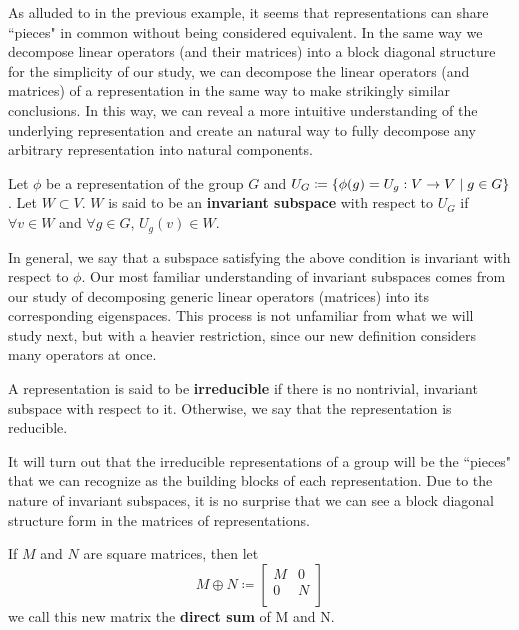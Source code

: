 As alluded to in the previous example, it seems that representations can share ``pieces" in common without being considered equivalent. In the same way we decompose linear operators (and their matrices) into a block diagonal structure for the simplicity of our study, we can decompose the linear operators (and matrices) of a representation in the same way to make strikingly similar conclusions. In this way, we can reveal a more intuitive understanding of the underlying representation and create an natural way to fully decompose any arbitrary representation into natural components. 

\begin{definition}
	Let $\phi$ be a representation of the group $G$ and $U_G \coloneq \{\phi(g)=U_g: V\rightarrow V \hspace{1mm}| \hspace{1mm} g\in G\}$. Let $W \subset V$. $W$ is said to be an \textbf{invariant subspace} with respect to $U_G$ if $\forall v \in W$ and $\forall g \in G$, $U_g(v)\in W$.
\end{definition}

In general, we say that a subspace satisfying the above condition is invariant with respect to $\phi$. Our most familiar understanding of invariant subspaces comes from our study of decomposing generic linear operators (matrices) into its corresponding eigenspaces. This process is not unfamiliar from what we will study next, but with a heavier restriction, since our new definition considers many operators at once.

\begin{definition}
	A representation is said to be \textbf{irreducible} if there is no nontrivial, invariant subspace with respect to it. Otherwise, we say that the representation is reducible.
\end{definition}

It will turn out that the irreducible representations of a group will be the ``pieces" that we can recognize as the building blocks of each representation. Due to the nature of invariant subspaces, it is no surprise that we can see a block diagonal structure form in the matrices of representations.

\begin{definition}
	If $M$ and $N$ are square matrices, then let $$M\oplus N \coloneq \begin{bmatrix}
																			M & 0\\
																			0 & N\\
																		\end{bmatrix}$$
	we call this new matrix the \textbf{direct sum} of M and N.
\end{definition}

